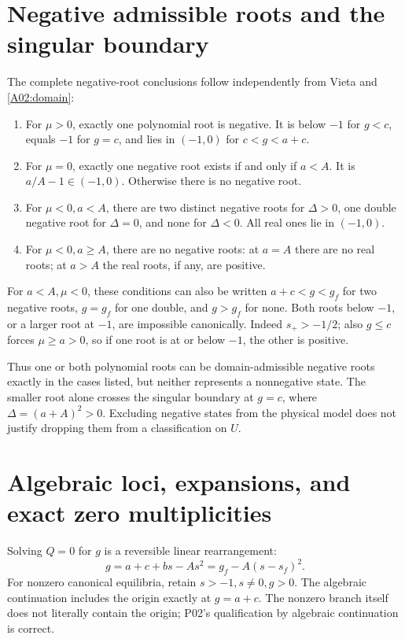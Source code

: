 \documentclass[11pt]{article}
\begin{document}
\section{Negative admissible roots and the singular boundary}

The complete negative-root conclusions follow independently from
Vieta and \eqref{A02:domain}:
\begin{enumerate}
\item For \(\mu>0\), exactly one polynomial root is negative.
It is below \(-1\) for \(g<c\), equals \(-1\) for \(g=c\), and
lies in \((-1,0)\) for \(c<g<a+c\).
\item For \(\mu=0\), exactly one negative root exists if and only if
\(a<A\). It is \(a/A-1\in(-1,0)\). Otherwise there is no negative root.
\item For \(\mu<0,a<A\), there are two distinct negative roots for
\(\Delta>0\), one double negative root for \(\Delta=0\), and none
for \(\Delta<0\). All real ones lie in \((-1,0)\).
\item For \(\mu<0,a\ge A\), there are no negative roots:
at \(a=A\) there are no real roots; at \(a>A\) the real roots,
if any, are positive.
\end{enumerate}
For \(a<A,\mu<0\), these conditions can also be written
\(a+c<g<g_f\) for two negative roots, \(g=g_f\) for one double,
and \(g>g_f\) for none. Both roots below \(-1\), or a larger root
at \(-1\), are impossible canonically. Indeed \(s_+>-1/2\);
also \(g\le c\) forces \(\mu\ge a>0\), so if one root is at or
below \(-1\), the other is positive.

Thus one or both polynomial roots can be domain-admissible negative
roots exactly in the cases listed, but neither represents a
nonnegative state. The smaller root alone crosses the singular boundary
at \(g=c\), where \(\Delta=(a+A)^2>0\). Excluding negative states
from the physical model does not justify dropping them from a
classification on \(U\).

\section{Algebraic loci, expansions, and exact zero multiplicities}

Solving \(Q=0\) for \(g\) is a reversible linear rearrangement:
\begin{equation}\label{A02:graph}
g=a+c+bs-As^2=g_f-A(s-s_f)^2.
\end{equation}
For nonzero canonical equilibria, retain \(s>-1,s\ne0,g>0\).
The algebraic continuation includes the origin exactly at \(g=a+c\).
The nonzero branch itself does not literally contain the origin;
P02's qualification by algebraic continuation is correct.
\end{document}
